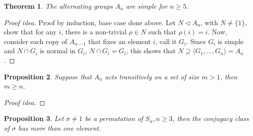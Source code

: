 \documentclass[paper=a4, fontsize=12pt]{scrartcl} %
\newtheorem{thm}{Theorem}[section]
\newtheorem{prop}[thm]{Proposition}
\theoremstyle{definition}
\theoremstyle{remark}
\numberwithin{equation}{section} %
\numberwithin{figure}{section} %
\numberwithin{table}{section} %
\begin{document}
\begin{thm}
	The alternating groups $A_n$ are simple for $n \geq 5$.
\end{thm}
\begin{proof}[Proof idea]
	Proof by induction, base case done above. Let $N \lhd A_n$, with $N \neq \{1\}$, show that for any $i$, there is a non-trivial $\rho \in N$ such that $\rho(i) = i$. Now, consider each copy of $A_{n-1}$ that fixes an element $i$, call it $G_i$. Since $G_i$ is simple and $N\cap G_i$ is normal in $G_i$, $N \cap G_i = G_i$, this shows that $N \supseteq \langle G_1, \dots, G_n \rangle = A_n$.
\end{proof}
\begin{prop}
	Suppose that $A_n$ acts transitively on a set of size $m>1$, then $m \geq n$.
\end{prop}
\begin{proof}[Proof idea]
	
\end{proof}
\begin{prop}
	Let $\sigma \neq 1$ be a permutation of $S_n, n \geq 3$, then the conjugacy class of $\sigma$ has more than one element. 
\end{prop}
\end{document}
